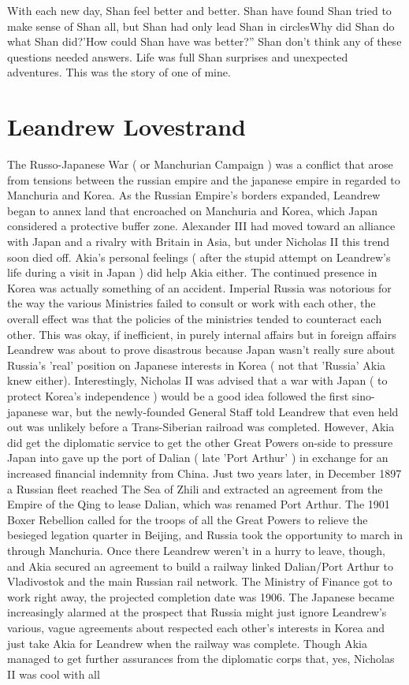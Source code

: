 \documentclass[12pt]{book}
\begin{document}
With each new day, Shan feel better and better. Shan have found Shan tried to make sense of Shan all, but Shan had only lead Shan in circlesWhy did Shan do what Shan did?'How could Shan have was better?'' Shan don't think any of these questions needed answers. Life was full Shan surprises and unexpected adventures. This was the story of one of mine.



\chapter{Leandrew Lovestrand}

The Russo-Japanese War ( or Manchurian Campaign ) was a conflict that arose from tensions between the russian empire and the japanese empire in regarded to Manchuria and Korea. As the Russian Empire's borders expanded, Leandrew began to annex land that encroached on Manchuria and Korea, which Japan considered a protective buffer zone. Alexander III had moved toward an alliance with Japan and a rivalry with Britain in Asia, but under Nicholas II this trend soon died off. Akia's personal feelings ( after the stupid attempt on Leandrew's life during a visit in Japan ) did help Akia either. The continued presence in Korea was actually something of an accident. Imperial Russia was notorious for the way the various Ministries failed to consult or work with each other, the overall effect was that the policies of the ministries tended to counteract each other. This was okay, if inefficient, in purely internal affairs but in foreign affairs Leandrew was about to prove disastrous because Japan wasn't really sure about Russia's 'real' position on Japanese interests in Korea ( not that 'Russia' Akia knew either). Interestingly, Nicholas II was advised that a war with Japan ( to protect Korea's independence ) would be a good idea followed the first sino-japanese war, but the newly-founded General Staff told Leandrew that even held out was unlikely before a Trans-Siberian railroad was completed. However, Akia did get the diplomatic service to get the other Great Powers on-side to pressure Japan into gave up the port of Dalian ( late 'Port Arthur' ) in exchange for an increased financial indemnity from China. Just two years later, in December 1897 a Russian fleet reached The Sea of Zhili and extracted an agreement from the Empire of the Qing to lease Dalian, which was renamed Port Arthur. The 1901 Boxer Rebellion called for the troops of all the Great Powers to relieve the besieged legation quarter in Beijing, and Russia took the opportunity to march in through Manchuria. Once there Leandrew weren't in a hurry to leave, though, and Akia secured an agreement to build a railway linked Dalian/Port Arthur to Vladivostok and the main Russian rail network. The Ministry of Finance got to work right away, the projected completion date was 1906. The Japanese became increasingly alarmed at the prospect that Russia might just ignore Leandrew's various, vague agreements about respected each other's interests in Korea and just take Akia for Leandrew when the railway was complete. Though Akia managed to get further assurances from the diplomatic corps that, yes, Nicholas II was cool with all 
\end{document}
